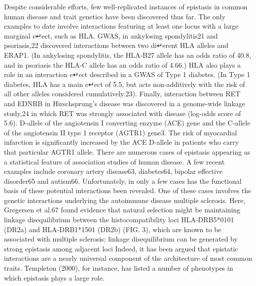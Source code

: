 
Despite considerable efforts, few well-replicated instances of epistasis in common human disease and trait genetics have been discovered thus far. \cite{zuk2012mystery}
The only examples to date involve interactions featuring at least one locus with a large marginal e↵ect, such as HLA.  \cite{zuk2012mystery}
GWAS, in ankylosing spondylitis21 and psoriasis,22 discovered interactions between two di↵erent HLA alleles and ERAP1. (In ankylosing spondylitis, the HLA-B27 allele has an odds ratio of 40.8, and in psoriasis the HLA-C allele has an odds ratio of 4.66.) HLA also plays a role in an interaction e↵ect described in a GWAS of Type 1 diabetes. (In Type 1 diabetes, HLA has a main e↵ect of 5.5, but acts non-additively with the risk of all other alleles considered cumulatively.23). Finally, interaction between RET and EDNRB in Hirschsprung's disease was discovered in a genome-wide linkage study,24 in which RET was strongly associated with disease (log-odds score of 5.6). \cite{zuk2012mystery}
D-allele of the angiotensin I converting enzyme (ACE) gene and the C-allele of the angiotensin II type 1 receptor (AGTR1) gene3. The risk of myocardial infarction is significantly increased by the ACE D-allele in patients who carry that particular AGTR1 allele. \cite{carlborg2004epistasis}
There are numerous cases of epistasis appearing as a statistical feature of association studies of human disease. A few recent examples include coronary artery disease63, diabetes64, bipolar effective disorder65 and autism66. Unfortunately, in only a few cases has the functional basis of these potential interactions been revealed.  \cite{phillips2008epistasis}
One of these cases involves the genetic interactions underlying the autoimmune disease multiple sclerosis. Here, Gregersen et al.67 found evidence that natural selection might be maintaining linkage disequilibrium between the histocompatibility loci HLA-DRB5*0101 (DR2a) and HLA-DRB1*1501 (DR2b) (FIG. 3), which are known to be associated with multiple sclerosis; linkage disequilibrium can be generated by strong epistasis among adjacent loci \cite{phillips2008epistasis}
Indeed, it has been argued that epistatic interactions are a nearly universal component of the architecture of most common traits. Templeton (2000), for instance, has listed a number of phenotypes in which epistasis plays a large role.  \cite{culverhouse2002perspective}
